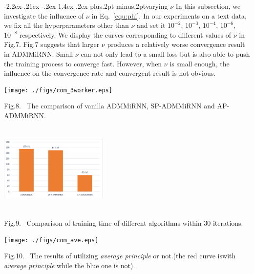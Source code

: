 \documentclass[twoside]{article}
\makeatletter
\def\subsubsection{\@startsection{subsubsection}{3}{\z@}%
 {-2.2ex\@plus -.21ex \@minus -.2ex}%
 {1.4ex \@plus.2ex}
{\normalfont\normalsize\protect\baselineskip=12pt plus.2pt minus.2pt\sl}}
\makeatother
\begin{document}
\begin{multicols}{2}
\subsubsection{varying $\nu$}
In this subsection, we investigate the influence of $\nu$ in Eq.~\eqref{equ:phi}. In our experiments on a text data, we fix all the hyperparameters other than $\nu$ and set it $10^{-2}$, $10^{-3}$, $10^{-4}$, $10^{-6}$, $10^{-8}$ respectively. We display the curves corresponding to different values of $\nu$ in Fig.7.
Fig.7 suggests that larger $\nu$ produces a relatively worse convergence result in ADMMiRNN. Small $\nu$ can not only lead to a small loss but is also able to push the training process to converge fast. However, when $\nu$ is small enough, the influence on the convergence rate and convergent result is not obvious.  
\begin{center}
\texttt{[image: ./figs/com\_3worker.eps]}\\
\vspace{2mm}
\parbox[c]{8.3cm}{\footnotesize{Fig.8.~}  The comparison of vanilla ADMMiRNN, SP-ADMMiRNN and AP-ADMMiRNN.}%
\label{fig:comparasion of 3 workers}
\vspace{-1em}
\end{center}
\begin{center}
\includegraphics[width=0.4\textwidth, height=12em]{./figs/zhu.eps}\\
\vspace{2mm}
\parbox[c]{8.3cm}{\footnotesize{Fig.9.~}  Comparison of training time of different algorithms within 30 iterations.}%
\label{fig:cost time 3 workers}
\end{center}
\begin{center}
\texttt{[image: ./figs/com\_ave.eps]}\\
\vspace{2mm}
\parbox[c]{8.3cm}{\footnotesize{Fig.10.~}  The results of utilizing \textit{average principle} or not.(the red curve iswith \textit{average principle} while the blue one is not).}%
\label{fig:average principle}
\end{center}

\end{multicols}
\end{document}
